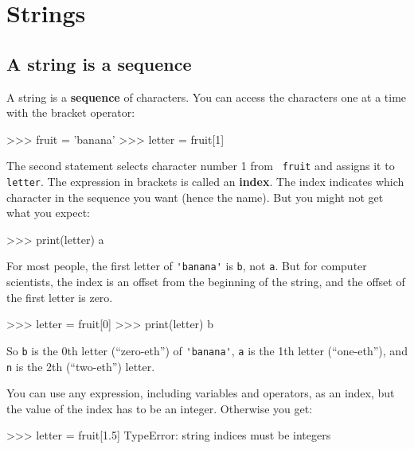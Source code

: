 \chapter{Strings}
\label{strings}


\section{A string is a sequence}

A string is a {\bf sequence} of characters.  
You can access the characters one at a time with the
bracket operator:

\beforeverb
\begin{pycode}
>>> fruit = 'banana'
>>> letter = fruit[1]
\end{pycode}
\afterverb
%
The second statement selects character number 1 from {\tt
fruit} and assigns it to {\tt letter}.  
%
%
The expression in brackets is called an {\bf index}.  
The index indicates which character in the sequence you
want (hence the name).
%
But you might not get what you expect:

\beforeverb
\begin{pycode}
>>> print(letter)
a
\end{pycode}
\afterverb
%
For most people, the first letter of \verb"'banana'" is {\tt b}, not
{\tt a}.  But for computer scientists, the index is an offset from the
beginning of the string, and the offset of the first letter is zero.

\beforeverb
\begin{pycode}
>>> letter = fruit[0]
>>> print(letter)
b
\end{pycode}
\afterverb
%
So {\tt b} is the 0th letter (``zero-eth'') of \verb"'banana'", {\tt a}
is the 1th letter (``one-eth''), and {\tt n} is the 2th (``two-eth'')
letter.


You can use any expression, including variables and operators, as an
index, but the value of the index has to be an integer.  Otherwise you
get:


\beforeverb
\begin{pycode}
>>> letter = fruit[1.5]
TypeError: string indices must be integers
\end{pycode}
\afterverb
%

